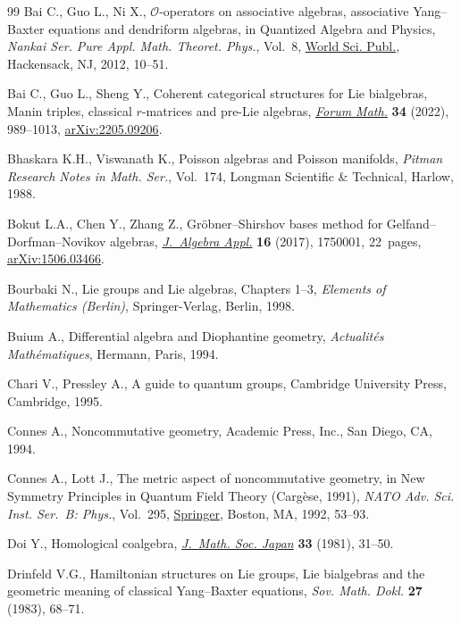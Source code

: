 \documentclass[pdftex]{sigma}
\numberwithin{equation}{section}
\begin{document}
\begin{thebibliography}{99}
Bai C., Guo L., Ni X., {$\mathcal{O}$}-operators on associative algebras,
 associative {Y}ang--{B}axter equations and dendriform algebras, in Quantized
 Algebra and Physics, \textit{Nankai Ser. Pure Appl. Math. Theoret. Phys.},
 Vol.~8, \href{https://doi.org/10.1142/9789814340458_0002}{World Sci. Publ.}, Hackensack, NJ, 2012, 10--51.

Bai C., Guo L., Sheng Y., Coherent categorical structures for {L}ie bialgebras,
 {M}anin triples, classical {$r$}-matrices and pre-{L}ie algebras,
 \href{https://doi.org/10.1515/forum-2021-0240}{\textit{Forum Math.}} \textbf{34} (2022), 989--1013, \href{https://arxiv.org/abs/2205.09206}{arXiv:2205.09206}.

Bhaskara K.H., Viswanath K., Poisson algebras and {P}oisson manifolds,
 \textit{Pitman Research Notes in Math. Ser.}, Vol.~174, Longman Scientific \&
 Technical, Harlow, 1988.

Bokut L.A., Chen Y., Zhang Z., Gr\"obner--{S}hirshov bases method for
 {G}elfand--{D}orfman--{N}ovikov algebras, \href{https://doi.org/10.1142/S0219498817500013}{\textit{J.~Algebra Appl.}}
 \textbf{16} (2017), 1750001, 22~pages, \href{https://arxiv.org/abs/1506.03466}{arXiv:1506.03466}.

Bourbaki N., Lie groups and {L}ie algebras, {C}hapters 1--3, \textit{Elements of
 Mathematics (Berlin)}, Springer-Verlag, Berlin, 1998.

Buium A., Differential algebra and {D}iophantine geometry, \textit{Actualit\'es
 Math\'ematiques}, Hermann, Paris, 1994.

Chari V., Pressley A., A guide to quantum groups, Cambridge University Press,
 Cambridge, 1995.

Connes A., Noncommutative geometry, Academic Press, Inc., San Diego, CA, 1994.

Connes A., Lott J., The metric aspect of noncommutative geometry, in New
 Symmetry Principles in Quantum Field Theory ({C}arg\`ese, 1991), \textit{NATO
 Adv. Sci. Inst. Ser.~B: Phys.}, Vol.~295, \href{https://doi.org/10.1007/978-1-4615-3472-3_3}{Springer}, Boston, MA, 1992, 53--93.

Doi Y., Homological coalgebra, \href{https://doi.org/10.2969/jmsj/03310031}{\textit{J.~Math. Soc. Japan}} \textbf{33} (1981),
 31--50.

Drinfeld V.G., Hamiltonian structures on {L}ie groups, {L}ie bialgebras and the
 geometric meaning of classical {Y}ang--{B}axter equations, \textit{Sov. Math.
 Dokl.} \textbf{27} (1983), 68--71.


\end{thebibliography}
\end{document}
